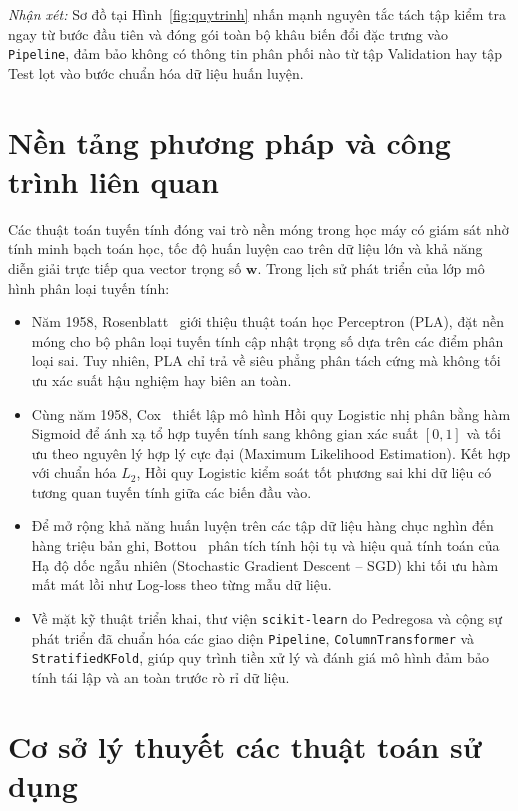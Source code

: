 \documentclass[12pt,a4paper,oneside]{report}
\begin{document}
\textit{Nhận xét:} Sơ đồ tại Hình~\ref{fig:quytrinh} nhấn mạnh nguyên tắc tách tập kiểm tra ngay từ bước đầu tiên và đóng gói toàn bộ khâu biến đổi đặc trưng vào \texttt{Pipeline}, đảm bảo không có thông tin phân phối nào từ tập Validation hay tập Test lọt vào bước chuẩn hóa dữ liệu huấn luyện.

\section{Nền tảng phương pháp và công trình liên quan}

Các thuật toán tuyến tính đóng vai trò nền móng trong học máy có giám sát nhờ tính minh bạch toán học, tốc độ huấn luyện cao trên dữ liệu lớn và khả năng diễn giải trực tiếp qua vector trọng số $\mathbf{w}$. Trong lịch sử phát triển của lớp mô hình phân loại tuyến tính:
\begin{itemize}
  \item Năm 1958, Rosenblatt~\cite{rosenblatt1958} giới thiệu thuật toán học Perceptron (PLA), đặt nền móng cho bộ phân loại tuyến tính cập nhật trọng số dựa trên các điểm phân loại sai. Tuy nhiên, PLA chỉ trả về siêu phẳng phân tách cứng mà không tối ưu xác suất hậu nghiệm hay biên an toàn.
  \item Cùng năm 1958, Cox~\cite{cox1958} thiết lập mô hình Hồi quy Logistic nhị phân bằng hàm Sigmoid để ánh xạ tổ hợp tuyến tính sang không gian xác suất $[0, 1]$ và tối ưu theo nguyên lý hợp lý cực đại (Maximum Likelihood Estimation). Kết hợp với chuẩn hóa $L_2$, Hồi quy Logistic kiểm soát tốt phương sai khi dữ liệu có tương quan tuyến tính giữa các biến đầu vào.
  \item Để mở rộng khả năng huấn luyện trên các tập dữ liệu hàng chục nghìn đến hàng triệu bản ghi, Bottou~\cite{bottou2010} phân tích tính hội tụ và hiệu quả tính toán của Hạ độ dốc ngẫu nhiên (Stochastic Gradient Descent -- SGD) khi tối ưu hàm mất mát lồi như Log-loss theo từng mẫu dữ liệu.
  \item Về mặt kỹ thuật triển khai, thư viện \texttt{scikit-learn} do Pedregosa và cộng sự~\cite{pedregosa2011} phát triển đã chuẩn hóa các giao diện \texttt{Pipeline}, \texttt{ColumnTransformer} và \texttt{StratifiedKFold}, giúp quy trình tiền xử lý và đánh giá mô hình đảm bảo tính tái lập và an toàn trước rò rỉ dữ liệu.
\end{itemize}

\section{Cơ sở lý thuyết các thuật toán sử dụng}
\end{document}
